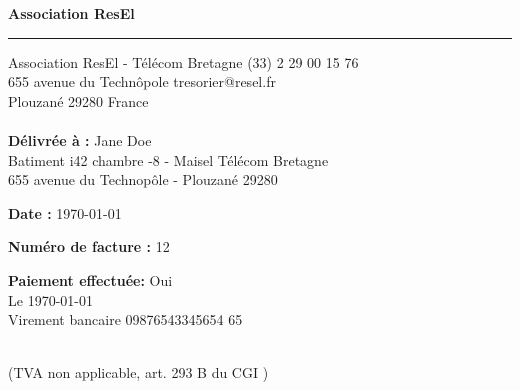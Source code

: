 \documentclass{invoice}
\def \tab {\hspace*{3ex}}
\begin{document}

\hfil{\Huge\bf Association ResEl}\hfil
\bigskip\break
\hrule

Association ResEl - Télécom Bretagne \hfill (33) 2 29 00 15 76 \\
655 avenue du Techn\^opole \hfill tresorier@resel.fr \\
Plouzan\'e 29280
France
\\ \\
{\bf D\'elivr\'ee \`a :}  Jane Doe \\
\tab Batiment i42 chambre -8 - Maisel T\'el\'ecom Bretagne \\
\tab 655 avenue du Technop\^ole - Plouzan\'e 29280

{\bf Date :}  \today

{\bf Num\'ero de facture :} 12

{\bf Paiement effectu\'ee:}  Oui \\
\tab Le \today \\
\tab Virement bancaire 09876543345654 65
\\ \\


\begin{invoiceTable}







\end{invoiceTable}


(TVA non applicable, art. 293 B du CGI )
\end{document}
